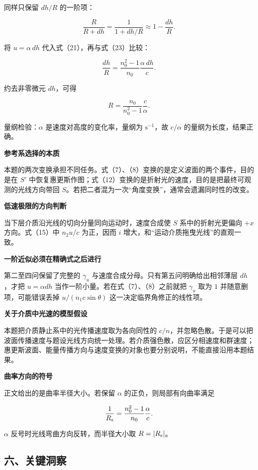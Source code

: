\documentclass[12pt,a4paper,UTF8]{ctexart}
\begin{document}
同样只保留 \(dh/R\) 的一阶项：

\[
\frac{R}{R+dh}
=\frac1{1+dh/R}
\approx1-\frac{dh}{R}.
\tag{23}
\]

将 \(u=\alpha\,dh\) 代入式（21），再与式（23）比较：

\[
\frac{dh}{R}
=\frac{n_0^2-1}{n_0}\frac{\alpha\,dh}{c}.
\]

约去非零微元 \(dh\)，可得

\[
\boxed{
R=\frac{n_0}{n_0^2-1}\frac{c}{\alpha}
}.
\tag{24}
\]

量纲检验：\(\alpha\) 是速度对高度的变化率，量纲为
\(\mathrm{s^{-1}}\)，故 \(c/\alpha\) 的量纲为长度，结果正确。

\textbf{参考系选择的本质}

本题的两次变换承担不同任务。式（7）、（8）变换的是定义波面的两个事件，目的是在
\(S'\)
中恢复惠更斯作图；式（12）变换的是折射光的速度，目的是把最终可观测的光线方向带回
\(S\)。若把二者混为一次``角度变换''，通常会遗漏同时性的改变。

\textbf{低速极限的方向判断}

当下层介质沿光线的切向分量同向运动时，速度合成使 \(S\)
系中的折射光更偏向 \(+x\) 方向。式（15）中 \(n_2u/c\) 为正，因而 \(i\)
增大，和``运动介质拖曳光线''的直观一致。

\textbf{一阶近似必须在精确式之后进行}

第二至四问保留了完整的 \(\gamma_u\)
与速度合成分母。只有第五问明确给出相邻薄层 \(dh\)，才把 \(u=\alpha dh\)
当作一阶小量。若在式（7）、（8）之前就把 \(\gamma_u\) 取为 \(1\)
并随意删项，可能错误丢掉 \(u/(n_1c\sin\theta)\)
这一决定临界角修正的线性项。

\textbf{关于介质中光速的模型假设}

本题把介质静止系中的光传播速度取为各向同性的
\(c/n\)，并忽略色散。于是可以把波面传播速度与题设光线方向统一处理。若介质强色散，应区分相速度和群速度；惠更斯波面、能量传播方向与速度变换的对象也要分别说明，不能直接沿用本题结果。

\textbf{曲率方向的符号}

正文给出的是曲率半径大小。若保留 \(\alpha\) 的正负，则局部有向曲率满足

\[
\frac1{R_{\rm s}}
=\frac{n_0^2-1}{n_0}\frac{\alpha}{c}.
\]

\(\alpha\) 反号时光线弯曲方向反转，而半径大小取 \(R=|R_{\rm s}|\)。

\subsection{六、关键洞察}\label{ux516dux5173ux952eux6d1eux5bdf-6}
\end{document}
